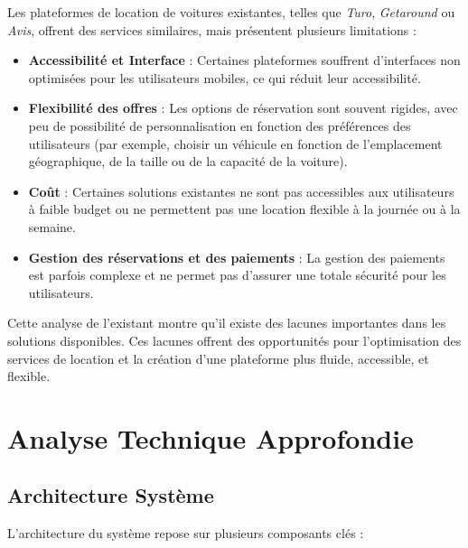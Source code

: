 Les plateformes de location de voitures existantes, telles que \textit{Turo}, \textit{Getaround} ou \textit{Avis}, offrent des services similaires, mais présentent plusieurs limitations :
\begin{itemize}
    \item \textbf{Accessibilité et Interface} : Certaines plateformes souffrent d’interfaces non optimisées pour les utilisateurs mobiles, ce qui réduit leur accessibilité.
    \item \textbf{Flexibilité des offres} : Les options de réservation sont souvent rigides, avec peu de possibilité de personnalisation en fonction des préférences des utilisateurs (par exemple, choisir un véhicule en fonction de l'emplacement géographique, de la taille ou de la capacité de la voiture).
    \item \textbf{Coût} : Certaines solutions existantes ne sont pas accessibles aux utilisateurs à faible budget ou ne permettent pas une location flexible à la journée ou à la semaine.
    \item \textbf{Gestion des réservations et des paiements} : La gestion des paiements est parfois complexe et ne permet pas d’assurer une totale sécurité pour les utilisateurs.
\end{itemize}

Cette analyse de l'existant montre qu'il existe des lacunes importantes dans les solutions disponibles. Ces lacunes offrent des opportunités pour l’optimisation des services de location et la création d’une plateforme plus fluide, accessible, et flexible.

\section{Analyse Technique Approfondie}
\subsection{Architecture Système}
L'architecture du système repose sur plusieurs composants clés :

